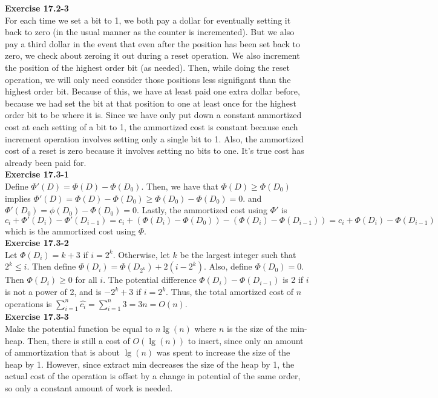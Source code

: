 \documentclass{article}
\begin{document}
\noindent\textbf{Exercise 17.2-3}\\

For each time we set a bit to 1, we both pay a dollar for eventually setting it back to zero (in the usual manner as the counter is incremented). But we also pay a third dollar in the event that even after the position has been set back to zero, we check about zeroing it out during a reset operation. We also increment the position of the highest order bit (as needed). Then, while doing the reset operation, we will only need consider those positions less signifigant than the highest order bit. Because of this, we have at least paid one extra dollar before, because we had set the bit at that position to one at least once for the highest order bit to be where it is. Since we have only put down a constant ammortized cost at each setting of a bit to 1, the ammortized cost is constant because each increment operation involves setting only a single bit to 1. Also, the ammortized cost of a reset is zero because it involves setting no bits to one. It's true cost has already been paid for.\\

\noindent\textbf{Exercise 17.3-1}\\

Define $\Phi'(D) = \Phi(D) -\Phi(D_0)$. Then, we have that $\Phi(D) \ge \Phi(D_0)$ implies $\Phi'(D)  = \Phi(D) - \Phi(D_0) \ge \Phi(D_0) -\Phi(D_0) = 0$. and $\Phi'(D_0) = \phi(D_0)-\Phi(D_0) = 0$. Lastly, the ammortized cost using $\Phi'$ is $c_i + \Phi'(D_i) -\Phi'(D_{i-1}) = c_i + (\Phi(D_i) - \Phi(D_0)) - (\Phi(D_i) -\Phi(D_{i-1})) = c_i + \Phi(D_i) -\Phi(D_{i-1})$ which is the ammortized cost using $\Phi$.\\

\noindent\textbf{Exercise 17.3-2}\\

Let $\Phi(D_i) = k+3$ if $i =  2^k$.  Otherwise, let $k$ be the largest integer such that $2^k \leq i$.  Then define $\Phi(D_i) = \Phi(D_{2^k}) + 2(i-2^k)$.   Also, define $\Phi(D_0) = 0$.  Then $\Phi(D_i) \geq 0$ for all $i$.  The potential difference $\Phi(D_i) - \Phi(D_{i-1})$ is 2 if $i$ is not a power of 2, and is $-2^k + 3$ if $i=2^k$.   Thus, the total amortized cost of $n$ operations is $\sum_{i=1}^n \hat{c_i} = \sum_{i=1}^n 3 = 3n = O(n)$.  \\


\noindent\textbf{Exercise 17.3-3}\\

Make the potential function be equal to $n\lg(n)$ where $n$ is the size of the min-heap. Then, there is still a cost of $O(\lg(n))$ to insert, since only an amount of ammortization that is about $\lg(n)$ was spent to increase the size of the heap by 1. However, since extract min decreases the size of the heap by 1, the actual cost of the operation is offset by a change in potential of the same order, so only a constant amount of work is needed.\\
 
\end{document}
